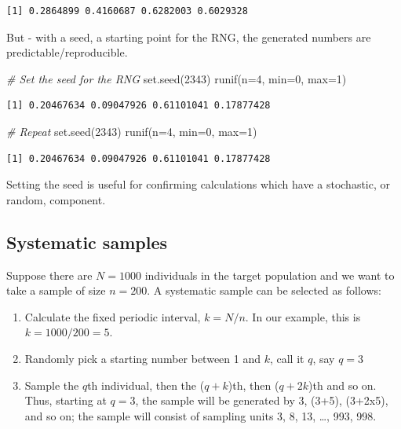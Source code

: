 \documentclass[
  oneside]{krantz}
\newenvironment{Shaded}{\begin{snugshade}}{\end{snugshade}}
\newcommand{\AttributeTok}[1]{\textcolor[rgb]{0.77,0.63,0.00}{#1}}
\newcommand{\CommentTok}[1]{\textcolor[rgb]{0.56,0.35,0.01}{\textit{#1}}}
\newcommand{\DecValTok}[1]{\textcolor[rgb]{0.00,0.00,0.81}{#1}}
\newcommand{\FunctionTok}[1]{\textcolor[rgb]{0.00,0.00,0.00}{#1}}
\newcommand{\NormalTok}[1]{#1}
\begin{document}
\begin{verbatim}
[1] 0.2864899 0.4160687 0.6282003 0.6029328
\end{verbatim}

But - with a seed, a starting point for the RNG, the generated numbers are predictable/reproducible.

\begin{Shaded}
\begin{Highlighting}[]
\CommentTok{\# Set the seed for the RNG}
\FunctionTok{set.seed}\NormalTok{(}\DecValTok{2343}\NormalTok{)}
\FunctionTok{runif}\NormalTok{(}\AttributeTok{n=}\DecValTok{4}\NormalTok{, }\AttributeTok{min=}\DecValTok{0}\NormalTok{, }\AttributeTok{max=}\DecValTok{1}\NormalTok{)}
\end{Highlighting}
\end{Shaded}

\begin{verbatim}
[1] 0.20467634 0.09047926 0.61101041 0.17877428
\end{verbatim}

\begin{Shaded}
\begin{Highlighting}[]
\CommentTok{\# Repeat}
\FunctionTok{set.seed}\NormalTok{(}\DecValTok{2343}\NormalTok{)}
\FunctionTok{runif}\NormalTok{(}\AttributeTok{n=}\DecValTok{4}\NormalTok{, }\AttributeTok{min=}\DecValTok{0}\NormalTok{, }\AttributeTok{max=}\DecValTok{1}\NormalTok{)}
\end{Highlighting}
\end{Shaded}

\begin{verbatim}
[1] 0.20467634 0.09047926 0.61101041 0.17877428
\end{verbatim}

Setting the seed is useful for confirming calculations which have a stochastic, or random, component.

\hypertarget{systematic-samples}{%
\subsection{Systematic samples}\label{systematic-samples}}

Suppose there are \(N=1000\) individuals in the target population and we want to take a sample of size \(n=200\). A systematic sample can be selected as follows:

\begin{enumerate}
\def\labelenumi{\arabic{enumi}.}
\item
  Calculate the fixed periodic interval, \(k = N/n\). In our example, this is \(k = 1000/200 = 5\).
\item
  Randomly pick a starting number between 1 and \(k\), call it \(q\), say \(q=3\)
\item
  Sample the \(q\)th individual, then the (\(q+k\))th, then (\(q+2k\))th and so on. Thus, starting at \(q=3\), the sample will be generated by 3, (3+5), (3+2x5), and so on; the sample will consist of sampling units 3, 8, 13, \ldots, 993, 998.
\end{enumerate}
\end{document}
